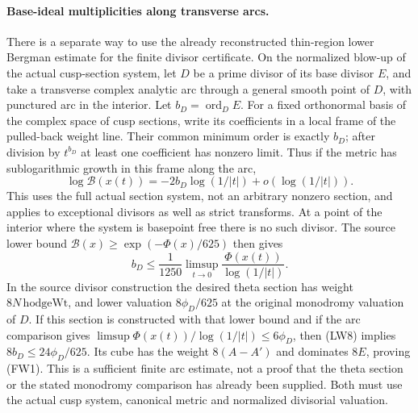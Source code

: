 \paragraph{Base-ideal multiplicities along transverse arcs.}
There is a separate way to use the already reconstructed
thin-region lower Bergman estimate for the finite divisor
certificate. On the normalized blow-up of the actual
cusp-section system, let \(D\) be a prime divisor of its
base divisor \(E\), and take a transverse complex analytic
arc through a general smooth point of \(D\), with punctured
arc in the interior. Let \(b_D=\operatorname{ord}_D E\).
For a fixed orthonormal basis of the complex space of
cusp sections, write its coefficients in a local frame of
the pulled-back weight line. Their common minimum order
is exactly \(b_D\); after division by \(t^{b_D}\) at least
one coefficient has nonzero limit. Thus if the metric
has sublogarithmic growth in this frame along the arc,
\[
       \log\mathcal B(x(t))=-2 b_D\log(1/|t|)
                                  +o(\log(1/|t|)).
\]
This uses the full actual section system, not an arbitrary
nonzero section, and applies to exceptional divisors as
well as strict transforms. At a point of the interior
where the system is basepoint free there is no such
divisor. The source lower bound
\(\mathcal B(x)\ge\exp(-\Phi(x)/625)\) then gives
\[
 b_D\le\frac1{1250}
             \limsup_{t\to0}\frac{\Phi(x(t))}{\log(1/|t|)}.
                                                               \tag{LW8}
\]
In the source divisor construction the desired theta
section has weight \(8N\,\mathrm{hodgeWt}\), and lower
valuation \(8\phi_D/625\) at the original monodromy
valuation of \(D\). If this section is constructed with
that lower bound and if the arc comparison gives
\(\limsup\Phi(x(t))/\log(1/|t|)\le6\phi_D\), then (LW8)
implies \(8b_D\le24\phi_D/625\).
Its cube has the weight \(8(A-A')\) and dominates
\(8E\), proving (FW1). This is a sufficient finite
arc estimate, not a proof that the theta section or
the stated monodromy comparison has already been supplied.
Both must use the actual cusp system, canonical metric
and normalized divisorial valuation.
